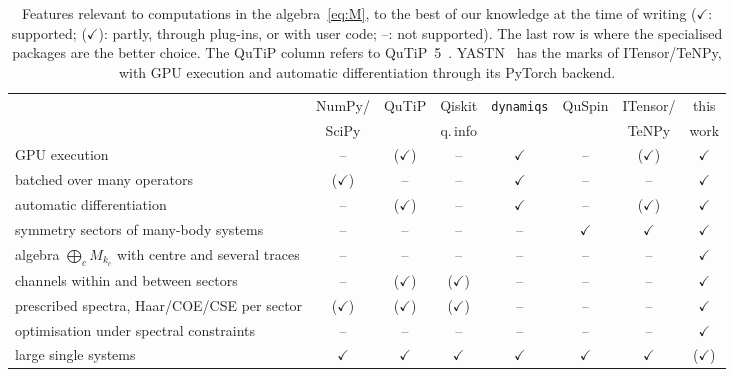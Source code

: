 \documentclass[11pt]{article}
\begin{document}
\begin{table}[h]
\centering\footnotesize
\setlength{\tabcolsep}{3pt}
\begin{tabular}{lccccccc}
\toprule
 & NumPy/ & QuTiP & Qiskit & \texttt{dynamiqs} & QuSpin & ITensor/ & this\\
 & SciPy & & q.\,info & & & TeNPy & work\\
\midrule
GPU execution & -- & ($\checkmark$) & -- & $\checkmark$ & -- & ($\checkmark$) & $\checkmark$\\
batched over many operators & ($\checkmark$) & -- & -- & $\checkmark$ & -- & -- & $\checkmark$\\
automatic differentiation & -- & ($\checkmark$) & -- & $\checkmark$ & -- & ($\checkmark$) & $\checkmark$\\
symmetry sectors of many-body systems & -- & -- & -- & -- & $\checkmark$ & $\checkmark$ & $\checkmark$\\
algebra $\bigoplus_cM_{k_c}$ with centre and several traces & -- & -- & -- & -- & -- & -- & $\checkmark$\\
channels within and between sectors & -- & ($\checkmark$) & ($\checkmark$) & -- & -- & -- & $\checkmark$\\
prescribed spectra, Haar/COE/CSE per sector & ($\checkmark$) & ($\checkmark$) & ($\checkmark$) & -- & -- & -- & $\checkmark$\\
optimisation under spectral constraints & -- & -- & -- & -- & -- & -- & $\checkmark$\\
large single systems & $\checkmark$ & $\checkmark$ & $\checkmark$ & $\checkmark$ & $\checkmark$ & $\checkmark$ & ($\checkmark$)\\
\bottomrule
\end{tabular}
\caption{Features relevant to computations in the algebra~\eqref{eq:M}, to the best of our knowledge at the
time of writing ($\checkmark$: supported; ($\checkmark$): partly, through plug-ins, or with user code;
--: not supported). The last row is where the specialised packages are the better choice. The QuTiP column refers to
QuTiP~5~\cite{lambert2026}.
YASTN~\cite{rams2025} has the marks of ITensor/TeNPy, with GPU execution and automatic differentiation through its
PyTorch backend.}
\label{tab:software}
\end{table}
\end{document}
